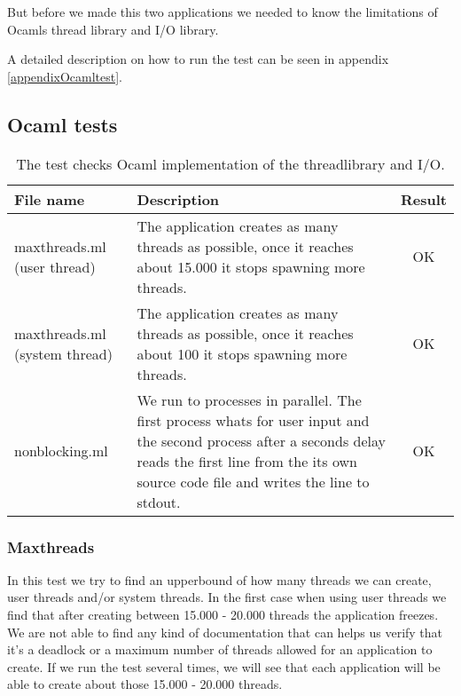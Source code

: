 \documentclass[a4paper,12pt]{article}
\begin{document}
But before we made this two applications we needed to know the limitations of
Ocamls thread library and I/O library.

A detailed description on how to run the test can be seen in appendix
\ref{appendixOcamltest}.

\subsection{Ocaml tests}
\label{ocamltests}
\begin{table}[!h]
  \begin{center}
    \begin{tabular}{|p{3cm}|p{8.5cm}|c|}
      \hline
      File name &
      Description &
      Result \\
      \hline
      maxthreads.ml (user thread) &
      The application creates as many threads as possible, once it reaches
      about 15.000 it stops spawning more threads.&
      OK \\
      \hline
      maxthreads.ml (system thread) &
      The application creates as many threads as possible, once it reaches
      about 100 it stops spawning more threads.&
      OK \\
      \hline
      nonblocking.ml &
      We run to processes in parallel. The first process whats for user input
      and the second process after a seconds delay reads the first line from
      the its own source code file and writes the line to stdout.&
      OK \\
      \hline
    \end{tabular} 
    \caption{The test checks Ocaml implementation of the threadlibrary and I/O.}
    \label{testtable}
  \end{center}
\end{table}

\subsubsection{Maxthreads}
In this test we try to find an upperbound of how many threads we can create,
user threads and/or system threads. In the first case when using user threads we
find that after creating between 15.000 - 20.000 threads the application
freezes. We are not able to find any kind of documentation that can helps us
verify that it's a deadlock or a maximum number of threads allowed for an
application to create. If we run the test several times, we will see that
each application will be able to create about those 15.000 - 20.000 threads.
\end{document}
